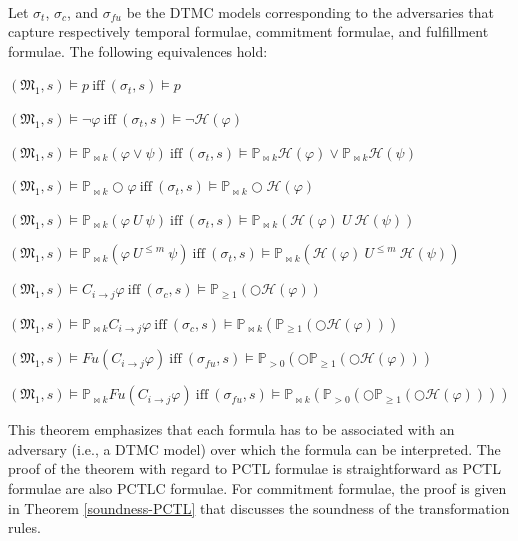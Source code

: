 %
%
\begin{theorem}\label{Satsisfaction-Equivelance}\hspace{0.5cm} \\

Let $\sigma_t$, $\sigma_c$, and $\sigma_{fu}$ be the DTMC models
corresponding to the adversaries that capture respectively temporal formulae, commitment formulae, and fulfillment formulae. The following equivalences hold:

$(\mathfrak{M_1},s)\models p ~\text{iff}~ (\sigma_t,s) \models p$

$(\mathfrak{M_1},s)\models \neg \varphi ~\text{iff}~ (\sigma_t,s)\models\neg \mathscr{H}(\varphi)$

$(\mathfrak{M_1},s)\models \mathbb{P}_{\bowtie k}(\varphi \vee \psi)
~\text{iff}~ (\sigma_t,s) \models \mathbb{P}_{\bowtie k} \mathscr{H}(\varphi) \vee \mathbb{P}_{\bowtie k} \mathscr{H}(\psi) $

$(\mathfrak{M_1},s)\models \mathbb{P}_{\bowtie k}\bigcirc\varphi ~\text{iff}~ (\sigma_t,s) \models\mathbb{P}_{\bowtie k} \bigcirc \mathscr{H}(\varphi) $

$(\mathfrak{M_1},s)\models\mathbb{P}_{\bowtie k}(\varphi~ U ~ \psi) ~\text{iff}~ (\sigma_t,s) \models \mathbb{P}_{\bowtie k}(\mathscr{H}(\varphi)~ U ~\mathscr{H}(\psi))$

$(\mathfrak{M_1},s)\models\mathbb{P}_{\bowtie k}(\varphi~ U^{\leq m} ~ \psi) ~\text{iff}~ (\sigma_t,s) \models \mathbb{P}_{\bowtie k}(\mathscr{H}(\varphi)~ U^{\leq m} ~\mathscr{H}(\psi))$

$(\mathfrak{M_1},s)\models C_{i \rightarrow j}\varphi ~\text{iff}~ (\sigma_c,s)\models \mathbb{P}_{\geq1}(\bigcirc\mathscr{H}(\varphi))$

$(\mathfrak{M_1},s)\models \mathbb{P}_{\bowtie k}C_{i \rightarrow j}\varphi ~\text{iff}~ (\sigma_c,s) \models \mathbb{P}_{\bowtie k}(\mathbb{P}_{\geq1}(\bigcirc\mathscr{H}(\varphi)))$

$(\mathfrak{M_1},s)\models Fu(C_{i \rightarrow j}\varphi) ~\text{iff}~ (\sigma_{fu},s) \models \mathbb{P}_{>0}(\bigcirc\mathbb{P}_{\geq 1}(\bigcirc \mathscr{H}(\varphi)))$

$(\mathfrak{M_1},s)\models \mathbb{P}_{\bowtie k}Fu(C_{i \rightarrow j}\varphi) ~\text{iff}~ (\sigma_{fu},s) \models \mathbb{P}_{\bowtie k} (\mathbb{P}_{>0}(\bigcirc\mathbb{P}_{\geq 1}(\bigcirc \mathscr{H}(\varphi))))$

\end{theorem}
This theorem emphasizes that each formula has to be associated
with an adversary (i.e., a DTMC model) over which the formula can
be interpreted. The proof of the theorem with regard to PCTL
formulae is straightforward as PCTL formulae are also PCTLC
formulae. For commitment formulae, the proof is given in Theorem
\ref{soundness-PCTL} that discusses the soundness of the transformation
rules.

